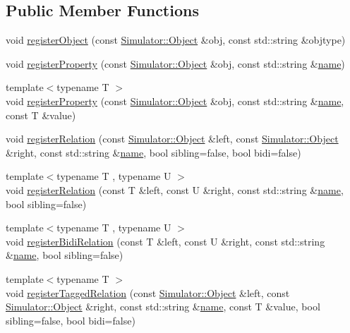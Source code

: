 \subsection*{Public Member Functions}
\begin{DoxyCompactItemize}
\item 
void \hyperlink{class_component_model_registry_a568f894311c2ad30b305e6b1fd93946a}{register\+Object} (const \hyperlink{class_simulator_1_1_object}{Simulator\+::\+Object} \&obj, const std\+::string \&objtype)
\item 
void \hyperlink{class_component_model_registry_a2a2228ef21439a5215265e49cee6eed9}{register\+Property} (const \hyperlink{class_simulator_1_1_object}{Simulator\+::\+Object} \&obj, const std\+::string \&\hyperlink{mtconf_8c_a8f8f80d37794cde9472343e4487ba3eb}{name})
\item 
{\footnotesize template$<$typename T $>$ }\\void \hyperlink{class_component_model_registry_a6b2e1fee7184d8392c47e9865c618a61}{register\+Property} (const \hyperlink{class_simulator_1_1_object}{Simulator\+::\+Object} \&obj, const std\+::string \&\hyperlink{mtconf_8c_a8f8f80d37794cde9472343e4487ba3eb}{name}, const T \&value)
\item 
void \hyperlink{class_component_model_registry_af84094d9ae18ee73e2726b99efd6a014}{register\+Relation} (const \hyperlink{class_simulator_1_1_object}{Simulator\+::\+Object} \&left, const \hyperlink{class_simulator_1_1_object}{Simulator\+::\+Object} \&right, const std\+::string \&\hyperlink{mtconf_8c_a8f8f80d37794cde9472343e4487ba3eb}{name}, bool sibling=false, bool bidi=false)
\item 
{\footnotesize template$<$typename T , typename U $>$ }\\void \hyperlink{class_component_model_registry_a429df2e02198d09d3ede691549119657}{register\+Relation} (const T \&left, const U \&right, const std\+::string \&\hyperlink{mtconf_8c_a8f8f80d37794cde9472343e4487ba3eb}{name}, bool sibling=false)
\item 
{\footnotesize template$<$typename T , typename U $>$ }\\void \hyperlink{class_component_model_registry_a3115e14ef7e333f9e7989ed0fd7b0cef}{register\+Bidi\+Relation} (const T \&left, const U \&right, const std\+::string \&\hyperlink{mtconf_8c_a8f8f80d37794cde9472343e4487ba3eb}{name}, bool sibling=false)
\item 
{\footnotesize template$<$typename T $>$ }\\void \hyperlink{class_component_model_registry_a74afd150d09c9a6c3a9f5ff3e92b3ca7}{register\+Tagged\+Relation} (const \hyperlink{class_simulator_1_1_object}{Simulator\+::\+Object} \&left, const \hyperlink{class_simulator_1_1_object}{Simulator\+::\+Object} \&right, const std\+::string \&\hyperlink{mtconf_8c_a8f8f80d37794cde9472343e4487ba3eb}{name}, const T \&value, bool sibling=false, bool bidi=false)

\end{DoxyCompactItemize}
